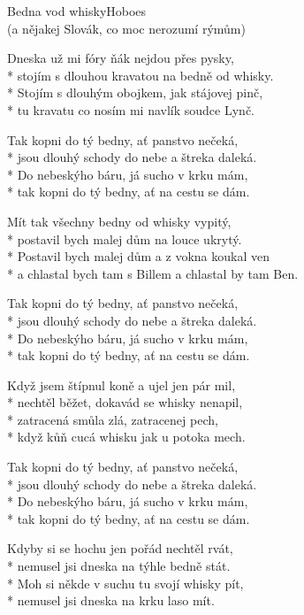 \documentclass[10.5pt]{book}
\begin{document}
\begin{poem}{Bedna vod whisky}{Hoboes\\(a nějakej Slovák, co moc nerozumí rýmům)}

\settowidth{\versewidth}{a chlastal bych tam s Billem a chlastal by tam Ben.}

Dneska už mi fóry ňák nejdou přes pysky,\\*
stojím s dlouhou kravatou na bedně od whisky.\\*
Stojím s dlouhým obojkem, jak stájovej pinč,\\*
tu kravatu co nosím mi navlík soudce Lynč.

Tak kopni do tý bedny, ať panstvo nečeká,\\*
jsou dlouhý schody do nebe a štreka daleká.\\*
Do nebeskýho báru, já sucho v krku mám,\\*
tak kopni do tý bedny, ať na cestu se dám.

Mít tak všechny bedny od whisky vypitý,\\*
postavil bych malej dům na louce ukrytý.\\*
Postavil bych malej dům a z vokna koukal ven\\*
a chlastal bych tam s Billem a chlastal by tam Ben.

Tak kopni do tý bedny, ať panstvo nečeká,\\*
jsou dlouhý schody do nebe a štreka daleká.\\*
Do nebeskýho báru, já sucho v krku mám,\\*
tak kopni do tý bedny, ať na cestu se dám.

Když jsem štípnul koně a ujel jen pár mil,\\*
nechtěl běžet, dokavád se whisky nenapil,\\*
zatracená smůla zlá, zatracenej pech,\\*
když kůň cucá whisku jak u potoka mech.

Tak kopni do tý bedny, ať panstvo nečeká,\\*
jsou dlouhý schody do nebe a štreka daleká.\\*
Do nebeskýho báru, já sucho v krku mám,\\*
tak kopni do tý bedny, ať na cestu se dám.

Kdyby si se hochu jen pořád nechtěl rvát,\\*
nemusel jsi dneska na týhle bedně stát.\\*
Moh si někde v suchu tu svojí whisky pít,\\*
nemusel jsi dneska na krku laso mít.


\end{poem}
\end{document}
